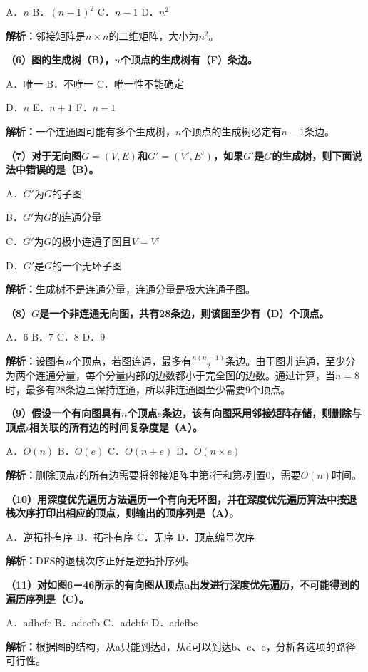 \documentclass[12pt,a4paper]{amsart}
\begin{document}
A．$n$ \quad B．$(n-1)^2$ \quad C．$n-1$ \quad D．$n^2$

\textbf{解析：}邻接矩阵是$n \times n$的二维矩阵，大小为$n^2$。

\textbf{（6）图的生成树（B），$n$个顶点的生成树有（F）条边。}

A．唯一 \quad B．不唯一 \quad C．唯一性不能确定

D．$n$ \quad E．$n+1$ \quad F．$n-1$

\textbf{解析：}一个连通图可能有多个生成树，$n$个顶点的生成树必定有$n-1$条边。

\textbf{（7）对于无向图$G=(V,E)$和$G'=(V',E')$，如果$G'$是$G$的生成树，则下面说法中错误的是（B）。}

A．$G'$为$G$的子图

B．$G'$为$G$的连通分量

C．$G'$为$G$的极小连通子图且$V=V'$

D．$G'$是$G$的一个无环子图

\textbf{解析：}生成树不是连通分量，连通分量是极大连通子图。

\textbf{（8）$G$是一个非连通无向图，共有28条边，则该图至少有（D）个顶点。}

A．6 \quad B．7 \quad C．8 \quad D．9

\textbf{解析：}设图有$n$个顶点，若图连通，最多有$\frac{n(n-1)}{2}$条边。由于图非连通，至少分为两个连通分量，每个分量内部的边数都小于完全图的边数。通过计算，当$n=8$时，最多有28条边且保持连通，所以非连通图至少需要9个顶点。

\textbf{（9）假设一个有向图具有$n$个顶点$e$条边，该有向图采用邻接矩阵存储，则删除与顶点$i$相关联的所有边的时间复杂度是（A）。}

A．$O(n)$ \quad B．$O(e)$ \quad C．$O(n+e)$ \quad D．$O(n \times e)$

\textbf{解析：}删除顶点$i$的所有边需要将邻接矩阵中第$i$行和第$i$列置0，需要$O(n)$时间。

\textbf{（10）用深度优先遍历方法遍历一个有向无环图，并在深度优先遍历算法中按退栈次序打印出相应的顶点，则输出的顶序列是（A）。}

A．逆拓扑有序 \quad B．拓扑有序 \quad C．无序 \quad D．顶点编号次序

\textbf{解析：}DFS的退栈次序正好是逆拓扑序列。

\textbf{（11）对如图6－46所示的有向图从顶点a出发进行深度优先遍历，不可能得到的遍历序列是（C）。}

A．adbefc \quad B．adcefb \quad C．adcbfe \quad D．adefbc

\textbf{解析：}根据图的结构，从a只能到达d，从d可以到达b、c、e，分析各选项的路径可行性。
\end{document}
